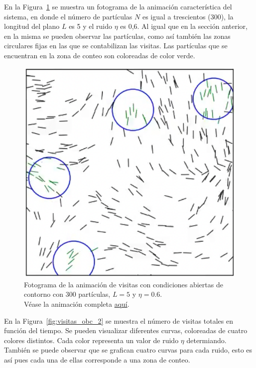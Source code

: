 \documentclass[11pt, a4paper]{article}
\begin{document}
            En la Figura~\ref{fig:visitas_obc_1} se muestra un fotograma de la animación característica del sistema, en donde
            el número de partículas $N$ es igual a trescientos (300), la longitud del plano $L$ es 5 y el ruido $\eta$ es 0,6.
            Al igual que en la sección anterior, en la misma se pueden observar las partículas, como así también las
            zonas circulares fijas en las que se contabilizan las visitas.
            Las partículas que se encuentran en la zona de conteo son coloreadas de color verde.

            \begin{figure}[H]
                \centering
                \includegraphics[width=\textwidth]{./animation_visits_obc-n300-eta0p6-frame}
                \caption{Fotograma de la animación de visitas con condiciones abiertas de contorno con $300$ partículas, $L = 5$ y $\eta = 0.6$.\\Véase la animación completa \href{https://youtu.be/ZcCPUwjMHBc}{aquí}.}
                \label{fig:visitas_obc_1}
            \end{figure}

            En la Figura~\ref{fig:visitas_obc_2} se muestra el número de visitas totales en función del tiempo.
            Se pueden visualizar diferentes curvas, coloreadas de cuatro colores distintos.
            Cada color representa un valor de ruido $\eta$ determiando.
            También se puede observar que se grafican cuatro curvas para cada ruido, esto es así pues cada una de ellas
            corresponde a una zona de conteo.
\end{document}
